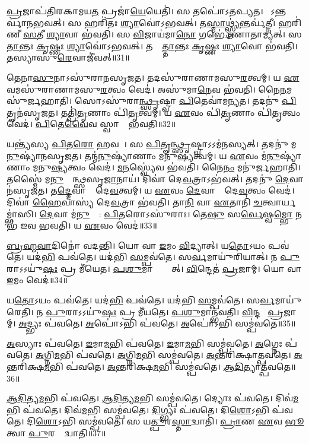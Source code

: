 \ul{𑌪𑍍𑌰}𑌜𑌾𑌪॑𑌤𑌿𑌰𑌕𑌾𑌮𑌯\ul{𑌤} 𑌪𑍍𑌰𑌜𑌾॑\ul{𑌯𑍇}𑌯𑍇𑌤𑌿॑।
𑌸 𑌤𑌪𑍋॑\-𑌽𑌤𑌪𑍍𑌯𑌤।
𑌸𑍋᳚𑌽𑌨𑍍𑌤𑌰𑍍𑌵𑌾॑𑌨𑌭𑌵𑌤𑍍।
𑌸 𑌹𑌰𑌿॑𑌤𑌃 \ul{𑌶𑍍𑌯𑌾}𑌵𑍋॑\-𑌽𑌭𑌵𑌤𑍍।
𑌤\ul{𑌸𑍍𑌮𑌾}𑌥𑍍𑌸𑍍𑌤𑍍𑌰𑍍𑌯॑𑌨𑍍𑌤𑌰𑍍𑌵॑𑌤𑍍𑌨𑍀।
𑌹𑌰𑌿॑𑌣𑍀 \ul{𑌸}𑌤𑍀 \ul{𑌶𑍍𑌯𑌾}𑌵𑌾 𑌭॑𑌵𑌤𑌿।
𑌸 \ul{𑌵𑌿}𑌜𑌾𑌯॑𑌮𑌾\ul{𑌨𑍋} 𑌗𑌰𑍍𑌭𑍇॑𑌣𑌾𑌤𑌾𑌮𑍍𑌯𑌤𑍍।
𑌸 \ul{𑌤𑌾}𑌨𑍍𑌤𑌃 \ul{𑌕𑍃}𑌷𑍍𑌣𑌃 \ul{𑌶𑍍𑌯𑌾}𑌵𑍋॑\-𑌽𑌭𑌵𑌤𑍍।
𑌤𑌸𑍍𑌮𑌾᳚\ul{𑌤𑍍𑌤𑌾}𑌨𑍍𑌤𑌃 \ul{𑌕𑍃}𑌷𑍍𑌣𑌃 \ul{𑌶𑍍𑌯𑌾}𑌵𑍋 𑌭॑𑌵𑌤𑌿।
𑌤𑌸𑍍𑌯𑌾𑌸𑍁॑\ul{𑌰𑍇}𑌵𑌾𑌜𑍀॑𑌵𑌤𑍍॥31॥

𑌤𑍇𑌨𑌾\ul{𑌸𑍁}𑌨𑌾\-𑌽𑌸𑍁॑𑌰𑌾𑌨𑌸𑍃𑌜𑌤।
𑌤𑌦𑌸𑍁॑𑌰𑌾𑌣𑌾𑌮𑌸𑍁\ul{𑌰}𑌤𑍍𑌵𑌮𑍍।
𑌯 \ul{𑌏}𑌵𑌮𑌸𑍁॑𑌰𑌾𑌣𑌾𑌮𑌸𑍁\ul{𑌰}𑌤𑍍𑌵𑌂 𑌵𑍇𑌦॑।
𑌅𑌸𑍁॑𑌮𑌾\ul{𑌨𑍇}𑌵 𑌭॑𑌵𑌤𑌿।
𑌨𑍈\ul{𑌨}𑌮𑌸𑍁॑𑌰𑍍𑌜𑌹𑌾𑌤𑌿।
𑌸𑍋𑌽𑌸𑍁॑𑌰𑌾\ul{𑌨𑍍𑌥𑍍𑌸𑍃}𑌷𑍍𑌟𑍍𑌵𑌾 \ul{𑌪𑌿}𑌤𑍇𑌵𑌾॑𑌮𑌨𑍍𑌯𑌤।
𑌤𑌦𑌨𑍁॑ \ul{𑌪𑌿}𑌤𑍄𑌨॑𑌸𑍃𑌜𑌤।
𑌤𑌤𑍍𑌪𑌿॑\ul{𑌤𑍃}𑌣𑌾𑌂 𑌪𑌿॑\ul{𑌤𑍃}𑌤𑍍𑌵𑌮𑍍।
𑌯 \ul{𑌏}𑌵𑌂 𑌪𑌿॑\ul{𑌤𑍃}𑌣𑌾𑌂 𑌪𑌿॑\ul{𑌤𑍃}𑌤𑍍𑌵𑌂 𑌵𑍇𑌦॑।
\ul{𑌪𑌿}𑌤𑍇\ul{𑌵𑍈}𑌵 𑌸𑍍𑌵𑌾𑌨𑌾𑌂᳚ 𑌭𑌵𑌤𑌿॥32॥

𑌯𑌨𑍍𑌤𑍍𑌯॑𑌸𑍍𑌯 \ul{𑌪𑌿}𑌤\ul{𑌰𑍋} 𑌹𑌵𑌮𑍍᳚।
𑌸 \ul{𑌪𑌿}𑌤𑍄\ul{𑌨𑍍𑌥𑍍𑌸𑍃}𑌷𑍍𑌟𑍍𑌵𑌾\-𑌽𑌽𑌮॑𑌨𑌸𑍍𑌯𑌤𑍍।
𑌤𑌦𑌨𑍁॑ 𑌮\ul{𑌨𑍁}𑌷𑍍𑌯𑌾॑𑌨𑌸𑍃𑌜𑌤।
𑌤𑌨𑍍𑌮॑\ul{𑌨𑍁}𑌷𑍍𑌯𑌾॑𑌣𑌾𑌂 𑌮𑌨𑍁\ul{𑌷𑍍𑌯}𑌤𑍍𑌵𑌮𑍍।
𑌯 \ul{𑌏}𑌵𑌂 𑌮॑\ul{𑌨𑍁}𑌷𑍍𑌯𑌾॑𑌣𑌾𑌂 𑌮𑌨𑍁\ul{𑌷𑍍𑌯}𑌤𑍍𑌵𑌂 𑌵𑍇𑌦॑।
\ul{𑌮}\ul{𑌨}𑌸𑍍𑌵𑍍𑌯𑍇॑𑌵 𑌭॑𑌵𑌤𑌿।
𑌨𑍈\ul{𑌨𑌂} 𑌮𑌨𑍁॑𑌰𑍍𑌜𑌹𑌾𑌤𑌿।
𑌤𑌸𑍍𑌮𑍈॑ 𑌮\ul{𑌨𑍁}𑌷𑍍𑌯𑌾᳚𑌨𑍍𑌥𑍍𑌸𑌸𑍃\ul{𑌜𑌾}𑌨𑌾𑌯॑।
𑌦𑌿𑌵𑌾॑ 𑌦𑍇\ul{𑌵}𑌤𑍍𑌰𑌾\-𑌽𑌭॑𑌵𑌤𑍍।
𑌤𑌦𑌨𑍁॑ \ul{𑌦𑍇}𑌵𑌾𑌨॑𑌸𑍃𑌜𑌤।
𑌤\ul{𑌦𑍍𑌦𑍇}𑌵𑌾𑌨𑌾𑌂᳚ 𑌦𑍇\ul{𑌵}𑌤𑍍𑌵𑌮𑍍।
𑌯 \ul{𑌏}𑌵𑌂 \ul{𑌦𑍇}𑌵𑌾𑌨𑌾𑌂᳚ 𑌦𑍇\ul{𑌵}𑌤𑍍𑌵𑌂 𑌵𑍇𑌦॑।
𑌦𑌿𑌵𑌾॑ \ul{𑌹𑍈}𑌵𑌾𑌸𑍍𑌯॑ 𑌦𑍇\ul{𑌵}𑌤𑍍𑌰𑌾 𑌭॑𑌵𑌤𑌿।
𑌤𑌾\ul{𑌨𑌿} 𑌵𑌾 \ul{𑌏}𑌤𑌾𑌨𑌿॑ \ul{𑌚}𑌤𑍍𑌵𑌾𑌰𑍍𑌯𑌮𑍍𑌭𑌾॑𑌸𑌿।
\ul{𑌦𑍇}𑌵𑌾 𑌮॑\ul{𑌨𑍁}𑌷𑍍𑌯𑌾᳚: \ul{𑌪𑌿}𑌤𑌰𑍋\-𑌽𑌸𑍁॑𑌰𑌾𑌃।
𑌤𑍇\ul{𑌷𑍁} 𑌸\ul{𑌰𑍍𑌵𑍇}𑌷𑍍𑌵\ul{𑌮𑍍𑌭𑍋} 𑌨𑌭॑ 𑌇𑌵 𑌭𑌵𑌤𑌿।
𑌯 \ul{𑌏}𑌵𑌂 𑌵𑍇𑌦॑॥33॥\anuvakamend[\ul{𑌅}\ul{𑌜𑍀}\ul{𑌵}𑌥𑍍𑌸𑍍𑌵𑌾𑌨𑌾𑌂᳚ 𑌭𑌵𑌤𑌿 \ul{𑌦𑍇}𑌵𑌾𑌨॑𑌸𑍃𑌜𑌤 \ul{𑌸}𑌪𑍍𑌤 𑌚॑]

\ul{𑌬𑍍𑌰}\ul{𑌹𑍍𑌮}\ul{𑌵𑌾}𑌦𑌿𑌨𑍋॑ 𑌵𑌦𑌨𑍍𑌤𑌿।
𑌯𑍋 𑌵𑌾 \ul{𑌇}𑌮𑌂 \ul{𑌵𑌿}𑌦𑍍𑌯𑌾𑌤𑍍।
𑌯\ul{𑌤𑍋}𑌽𑌯𑌂 𑌪𑌵॑𑌤𑍇।
𑌯𑌦॑\ul{𑌭𑌿} 𑌪𑌵॑𑌤𑍇।
𑌯𑌦॑𑌭𑌿 \ul{𑌸}𑌮𑍍𑌪𑌵॑𑌤𑍇।
𑌸\ul{𑌰𑍍𑌵}𑌮𑌾𑌯𑍁॑𑌰𑌿𑌯𑌾𑌤𑍍।
𑌨 \ul{𑌪𑍁}𑌰𑌾\-𑌽𑌽𑌯𑍁॑\ul{𑌷𑌃} 𑌪𑍍𑌰 𑌮𑍀॑𑌯𑍇𑌤।
\ul{𑌪}\ul{𑌶𑍁}𑌮𑌾𑌨𑍍𑌥𑍍𑌸𑍍𑌯𑌾᳚𑌤𑍍।
\ul{𑌵𑌿}𑌨𑍍𑌦𑍇𑌤॑ \ul{𑌪𑍍𑌰}𑌜𑌾𑌮𑍍।
𑌯𑍋 𑌵𑌾 \ul{𑌇}𑌮𑌂 𑌵𑍇𑌦॑॥34॥

𑌯\ul{𑌤𑍋}𑌽𑌯𑌂 𑌪𑌵॑𑌤𑍇।
𑌯𑌦॑\ul{𑌭𑌿} 𑌪𑌵॑𑌤𑍇।
𑌯𑌦॑𑌭𑌿 \ul{𑌸}𑌮𑍍𑌪𑌵॑𑌤𑍇।
𑌸\ul{𑌰𑍍𑌵}𑌮𑌾𑌯𑍁॑𑌰𑍇𑌤𑌿।
𑌨 \ul{𑌪𑍁}𑌰𑌾\-𑌽𑌽𑌯𑍁॑\ul{𑌷𑌃} 𑌪𑍍𑌰 𑌮𑍀॑𑌯𑌤𑍇।
\ul{𑌪}\ul{𑌶𑍁}𑌮𑌾𑌨𑍍𑌭॑𑌵𑌤𑌿।
\ul{𑌵𑌿}𑌨𑍍𑌦𑌤𑍇᳚ \ul{𑌪𑍍𑌰}𑌜𑌾𑌮𑍍।
\ul{𑌅}𑌦𑍍𑌭𑍍𑌯𑌃 𑌪॑𑌵𑌤𑍇।
\ul{𑌅}𑌪𑍋॑𑌽𑌭𑌿 𑌪॑𑌵𑌤𑍇।
\ul{𑌅}𑌪𑍋॑𑌽𑌭𑌿 𑌸𑌮𑍍𑌪॑𑌵𑌤𑍇॥35॥

\ul{𑌅}𑌸𑍍𑌯𑌾𑌃 𑌪॑𑌵𑌤𑍇।
\ul{𑌇}𑌮𑌾\ul{𑌮}𑌭𑌿 𑌪॑𑌵𑌤𑍇।
\ul{𑌇}𑌮𑌾\ul{𑌮}𑌭𑌿 𑌸𑌮𑍍𑌪॑𑌵𑌤𑍇।
\ul{𑌅}𑌗𑍍𑌨𑍇𑌃 𑌪॑𑌵𑌤𑍇।
\ul{𑌅}𑌗𑍍𑌨𑌿\ul{𑌮}𑌭𑌿 𑌪॑𑌵𑌤𑍇।
\ul{𑌅}𑌗𑍍𑌨𑌿\ul{𑌮}𑌭𑌿 𑌸𑌮𑍍𑌪॑𑌵𑌤𑍇।
\ul{𑌅}𑌨𑍍𑌤𑌰𑌿॑𑌕𑍍𑌷𑌾𑌤𑍍𑌪𑌵𑌤𑍇।
\ul{𑌅}𑌨𑍍𑌤𑌰𑌿॑𑌕𑍍𑌷\ul{𑌮}𑌭𑌿 𑌪॑𑌵𑌤𑍇।
\ul{𑌅}𑌨𑍍𑌤𑌰𑌿॑𑌕𑍍𑌷\ul{𑌮}𑌭𑌿 𑌸𑌮𑍍𑌪॑𑌵𑌤𑍇।
\ul{𑌆}\ul{𑌦𑌿}𑌤𑍍𑌯𑌾𑌤𑍍𑌪॑𑌵𑌤𑍇॥36॥

\ul{𑌆}\ul{𑌦𑌿}𑌤𑍍𑌯\ul{𑌮}𑌭𑌿 𑌪॑𑌵𑌤𑍇।
\ul{𑌆}\ul{𑌦𑌿}𑌤𑍍𑌯\ul{𑌮}𑌭𑌿 𑌸𑌮𑍍𑌪॑𑌵𑌤𑍇।
𑌦𑍍𑌯𑍋𑌃 𑌪॑𑌵𑌤𑍇।
𑌦𑌿𑌵॑\ul{𑌮}𑌭𑌿 𑌪॑𑌵𑌤𑍇।
𑌦𑌿𑌵॑\ul{𑌮}𑌭𑌿 𑌸𑌮𑍍𑌪॑𑌵𑌤𑍇।
\ul{𑌦𑌿}𑌗𑍍𑌭𑍍𑌯𑌃 𑌪॑𑌵𑌤𑍇।
𑌦𑌿\ul{𑌶𑍋}𑌽𑌭𑌿 𑌪॑𑌵𑌤𑍇।
𑌦𑌿\ul{𑌶𑍋}𑌽𑌭𑌿 𑌸𑌮𑍍𑌪॑𑌵𑌤𑍇।
𑌸 𑌯\ul{𑌤𑍍𑌪𑍁}𑌰\ul{𑌸𑍍𑌤𑌾}𑌦𑍍𑌵𑌾𑌤𑌿॑।
\ul{𑌪𑍍𑌰𑌾}𑌣 \ul{𑌏}𑌵 \ul{𑌭𑍂}𑌤𑍍𑌵𑌾 \ul{𑌪𑍁}𑌰𑌸𑍍𑌤𑌾᳚𑌦𑍍𑌵𑌾𑌤𑌿॥37॥

